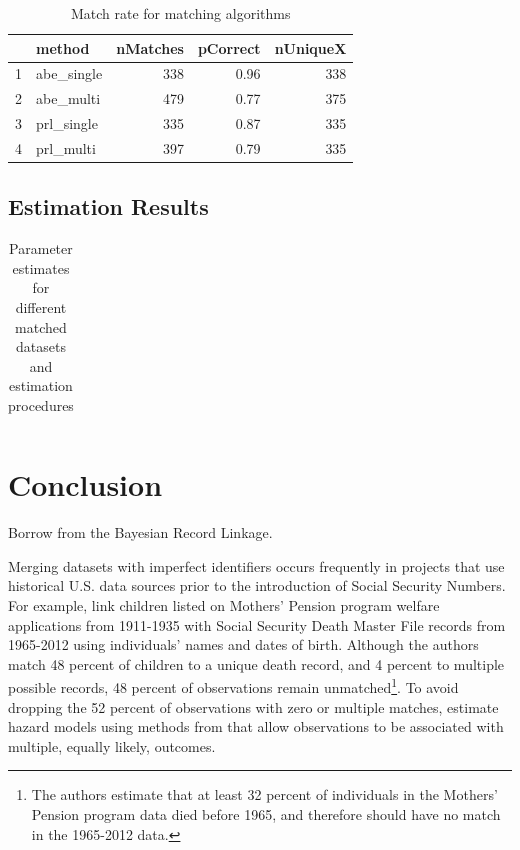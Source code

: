 \documentclass[12pt]{article}
\begin{document}
\begin{enumerate}
\begin{table}[ht]
\centering
\caption{Match rate for matching algorithms}
\vspace{5pt}
\begin{tabular}{rlrrr}
  \hline
 & method & nMatches & pCorrect & nUniqueX \\ 
  \hline
1 & abe\_single & 338 & 0.96 & 338 \\ 
  2 & abe\_multi & 479 & 0.77 & 375 \\ 
  3 & prl\_single & 335 & 0.87 & 335 \\ 
  4 & prl\_multi & 397 & 0.79 & 335 \\ 
   \hline
\end{tabular}
\end{table}

\subsection{Estimation Results}
\begin{table}[htdp]
\caption{Parameter estimates for different matched datasets and estimation procedures}
\begin{center}
\begin{tabular}{|c|c|}

\end{tabular}
\end{center}
\label{default}
\end{table}%


\section{Conclusion}
Borrow from the Bayesian Record Linkage. 


Merging datasets with imperfect identifiers occurs frequently in projects that use historical U.S. data sources prior to the introduction of Social Security Numbers.  For example, \cite{aizer2016} link children listed on Mothers' Pension program welfare applications from 1911-1935 with Social Security Death Master File records from 1965-2012 using individuals' names and dates of birth.  Although the authors match 48 percent of children to a unique death record, and 4 percent to multiple possible records, 48 percent of observations remain unmatched\footnote{The authors estimate that at least 32 percent of individuals in the Mothers' Pension program data died before 1965, and therefore should have no match in the 1965-2012 data.}.  To avoid dropping the 52 percent of observations with zero or multiple matches, \cite{aizer2016} estimate hazard models using methods from \cite{ahl2019} that allow observations to be associated with multiple, equally likely, outcomes.  


\end{enumerate}
\end{document}
